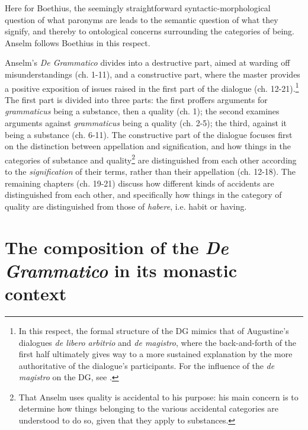 \documentclass[]{article}
\begin{document}
Here for Boethius, the seemingly straightforward syntactic-morphological question of what paronyms are leads to the semantic question of what they signify, and thereby to ontological concerns surrounding the categories of being. Anselm follows Boethius in this respect.

Anselm's \textit{De Grammatico} divides into a destructive part, aimed at warding off misunderstandings (ch. 1-11), and a constructive part, where the master provides a positive exposition of issues raised in the first part of the dialogue (ch. 12-21).\footnote{In this respect, the formal structure of the DG mimics that of Augustine's dialogues \textit{de libero arbitrio} and \textit{de magistro}, where the back-and-forth of the first half ultimately gives way to a more sustained explanation by the more authoritative of the dialogue's participants. For the influence of the \textit{de magistro} on the DG, see \cite[pp. 172-180]{Boschung2006}.} The first part is divided into three parts: the first proffers arguments for \textit{grammaticus} being a substance, then a quality (ch. 1); the second examines arguments against \textit{grammaticus} being a quality (ch. 2-5); the third, against it being a substance (ch. 6-11). The constructive part of the dialogue focuses first on the distinction between appellation and signification, and how things in the categories of substance and quality\footnote{That Anselm uses quality is accidental to his purpose: his main concern is to determine how things belonging to the various accidental categories are understood to do so, given that they apply to substances.} are distinguished from each other according to the \textit{signification} of their terms, rather than their appellation (ch. 12-18). The remaining chapters (ch. 19-21) discuss how different kinds of accidents are distinguished from each other, and specifically how things in the category of quality are distinguished from those of \textit{habere}, i.e. habit or having.
\section{The composition of the \textit{De Grammatico} in its monastic context}
\end{document}
